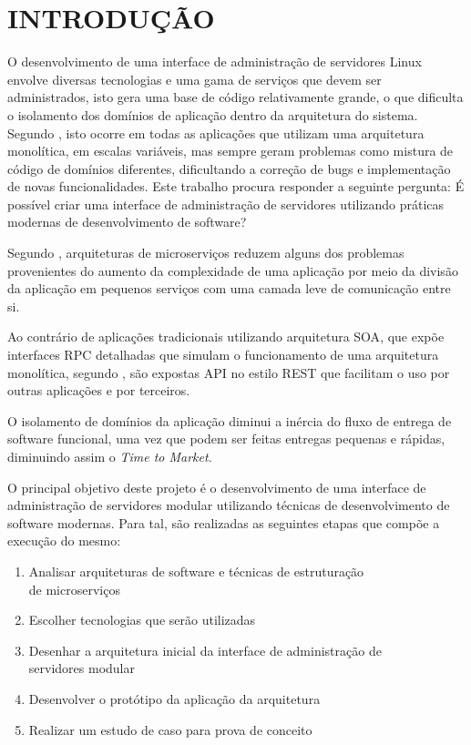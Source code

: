 \chapter{INTRODUÇÃO}
\label{chp:intro}

O desenvolvimento de uma interface de administração de servidores Linux
envolve diversas tecnologias e uma gama de serviços que devem ser
administrados, isto gera uma base de código relativamente grande, o que
dificulta o isolamento dos domínios de aplicação dentro da arquitetura
do sistema. Segundo , isto ocorre em todas as aplicações
que utilizam uma arquitetura monolítica, em escalas variáveis, mas sempre
geram problemas como mistura de código de domínios diferentes, dificultando
a correção de bugs e implementação de novas funcionalidades. Este trabalho
procura responder a seguinte pergunta: É possível criar uma interface de
administração de servidores utilizando práticas modernas de desenvolvimento
de software?

Segundo , arquiteturas de microserviços reduzem
alguns dos problemas provenientes do aumento da complexidade de uma aplicação
por meio da divisão da aplicação em pequenos serviços com uma camada leve
de comunicação entre si.

Ao contrário de aplicações tradicionais utilizando arquitetura
\ac{SOA}, que expõe interfaces \ac{RPC} detalhadas que simulam o funcionamento
de uma arquitetura monolítica, segundo , são expostas
\ac{API} no estilo \ac{REST} que facilitam o uso por outras aplicações e
por terceiros.

O isolamento de domínios da aplicação diminui a inércia do fluxo de entrega
de software funcional, uma vez que podem ser feitas entregas pequenas e
rápidas, diminuindo assim o \emph{Time to Market}.

O principal objetivo deste projeto é o desenvolvimento de uma interface
de administração de servidores modular utilizando técnicas de desenvolvimento
de software modernas. Para tal, são realizadas as seguintes etapas que compõe
a execução do mesmo:

\begin{enumerate}
  \item Analisar arquiteturas de software e técnicas de estruturação \\
    de microserviços
  \item Escolher tecnologias que serão utilizadas
  \item Desenhar a arquitetura inicial da interface de administração de \\
    servidores modular
  \item Desenvolver o protótipo da aplicação da arquitetura
  \item Realizar um estudo de caso para prova de conceito
\end{enumerate}

